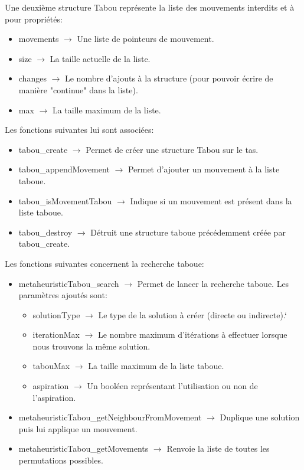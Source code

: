 \documentclass{EPUProjetPeiP}
\begin{document}
Une deuxième structure Tabou représente la liste des mouvements interdits et à pour propriétés:
\begin{itemize}
	\item movements $\longrightarrow$ Une liste de pointeurs de mouvement.
	\item size $\longrightarrow$ La taille actuelle de la liste.
	\item changes $\longrightarrow$ Le nombre d'ajouts à la structure (pour pouvoir écrire de manière "continue" dans la liste).
	\item max $\longrightarrow$ La taille maximum de la liste.\\
\end{itemize}

Les fonctions suivantes lui sont associées:
\begin{itemize}
	\item tabou\_create $\longrightarrow$ Permet de créer une structure Tabou sur le tas.
	\item tabou\_appendMovement $\longrightarrow$ Permet d'ajouter un mouvement à la liste taboue.
	\item tabou\_isMovementTabou $\longrightarrow$ Indique si un mouvement est présent dans la liste taboue.
	\item tabou\_destroy $\longrightarrow$ Détruit une structure taboue précédemment créée par tabou\_create.\\
\end{itemize}

Les fonctions suivantes concernent la recherche taboue:
\begin{itemize}
	\item metaheuristicTabou\_search $\longrightarrow$ Permet de lancer la recherche taboue. Les paramètres ajoutés sont:
	\begin{itemize}
		\item solutionType $\longrightarrow$ Le type de la solution à créer (directe ou indirecte).`
		\item iterationMax $\longrightarrow$ Le nombre maximum d'itérations à effectuer lorsque nous trouvons la même solution.
		\item tabouMax $\longrightarrow$ La taille maximum de la liste taboue.
		\item aspiration $\longrightarrow$ Un booléen représentant l'utilisation ou non de l'aspiration.
	\end{itemize}
	\item metaheuristicTabou\_getNeighbourFromMovement $\longrightarrow$ Duplique une solution puis lui applique un mouvement.
	\item metaheuristicTabou\_getMovements $\longrightarrow$ Renvoie la liste de toutes les permutations possibles.
\end{itemize}
\end{document}
